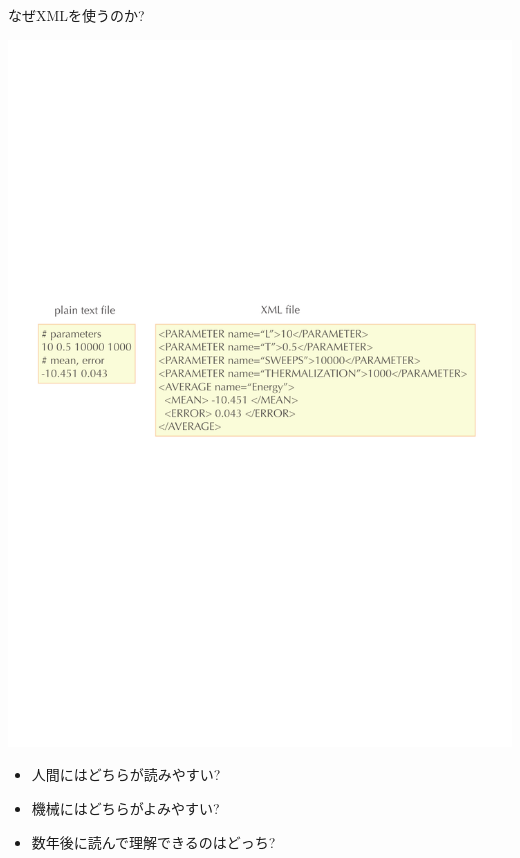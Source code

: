 \begin{frame}{なぜXMLを使うのか?}
  \begin{center}
    \includegraphics[width=.8\textwidth]{xml3.pdf}
  \end{center}
  \begin{itemize}
  \item 人間にはどちらが読みやすい?
  \item 機械にはどちらがよみやすい?
  \item 数年後に読んで理解できるのはどっち?
  \end{itemize}
\end{frame}

